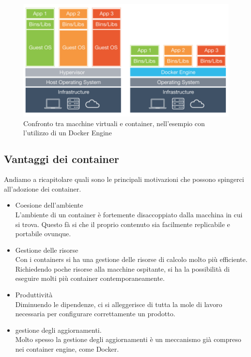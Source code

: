 \begin{figure}[h!]
	\centering
	\includegraphics[width=\textwidth,keepaspectratio=true]{capitoli/imgs/ContainersvsVms.PNG}
	\caption{Confronto tra macchine virtuali e container, nell'esempio con l'utilizzo di un Docker Engine}
\end{figure}

\subsection{Vantaggi dei container}
Andiamo a ricapitolare quali sono le principali motivazioni che possono spingerci all'adozione dei container.
\begin{itemize}
	\item Coesione dell'ambiente \\
	L'ambiente di un container è fortemente disaccoppiato dalla macchina in cui si trova. Questo fà si che il proprio contenuto sia facilmente replicabile e portabile ovunque.
	
	\item Gestione delle risorse \\
	Con i containers si ha una gestione delle risorse di calcolo molto più efficiente. Richiedendo poche risorse alla macchine ospitante, si ha la possibilità di eseguire molti più container contemporaneamente. 
	
	\item Produttività \\
	Diminuendo le dipendenze, ci si alleggerisce di tutta la mole di lavoro necessaria per configurare correttamente un prodotto. 
	
	\item gestione degli aggiornamenti. \\
	Molto spesso la gestione degli aggiornamenti è un meccanismo già compreso nei container engine, come Docker.
\end{itemize}

